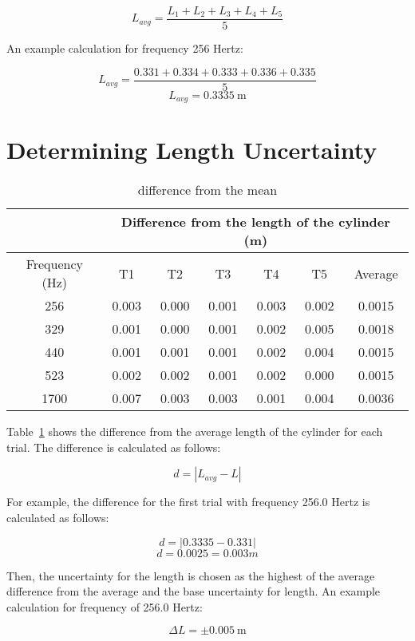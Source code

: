 \documentclass{article}
\begin{document}
\[L_{avg}=\frac{L_1+L_2+L_3+L_4+L_5}{5}\]

An example calculation for frequency 256 Hertz:

\[L_{avg}=\frac{0.331+0.334+0.333+0.336+0.335}{5}\]
\[L_{avg}=\SI{0.3335}{\metre}\]

\section{Determining Length Uncertainty}

\begin{table}[H]
  \centering
  \begin{tabular}{@{}ccccccc@{}}
    \toprule
    & \multicolumn{6}{c}{Difference from the length of the cylinder
    (m)} \\ \midrule
    Frequency (Hz) & T1        & T2       & T3       & T4       & T5
    & Average    \\
    256            & 0.003     & 0.000    & 0.001    & 0.003    &
    0.002    & 0.0015     \\
    329            & 0.001     & 0.000    & 0.001    & 0.002    &
    0.005    & 0.0018     \\
    440            & 0.001     & 0.001    & 0.001    & 0.002    &
    0.004    & 0.0015     \\
    523            & 0.002     & 0.002    & 0.001    & 0.002    &
    0.000    & 0.0015     \\
    1700           & 0.007     & 0.003    & 0.003    & 0.001    &
    0.004    & 0.0036     \\ \bottomrule
  \end{tabular}
  \caption{difference from the mean}\label{tab:diff-from-mean}
\end{table}

Table~\ref{tab:diff-from-mean} shows the difference from the average
length of the cylinder
for each trial. The difference is calculated as follows:

\[d=|L_{avg}-L|\]

For example, the difference for the first trial with frequency 256.0
Hertz is calculated as follows:

\[d=|0.3335-0.331|\]
\[d=0.0025=0.003 m\]

Then, the uncertainty for the length is chosen as the highest of the
average difference from the average and the base uncertainty for
length. An example calculation for frequency of 256.0 Hertz:

\[\Delta L=\pm\SI{0.005}{\metre}\]
\end{document}

